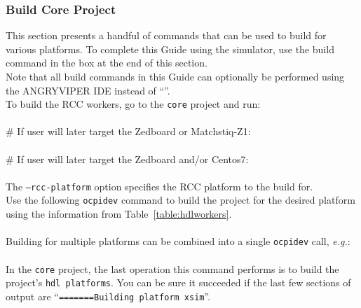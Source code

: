 \subsubsection{Build Core Project}
This section presents a handful of commands that can be used to build for various platforms. To complete this Guide using the  simulator, use the build command in the box at the end of this section. \\

Note that all build commands in this Guide can optionally be performed using the ANGRYVIPER IDE instead of ``''.\\

To build the RCC workers, go to the \texttt{core} project and run:\\ \\
\# If user will later target the Zedboard or Matchstiq-Z1:\\
\\

\# If user will later target the Zedboard and/or Centos7:\\
\\

The \texttt{--rcc-platform} option specifies the RCC platform to the build for.\\

Use the following \verb+ocpidev+ command to build the project for the desired platform using the information from Table~\ref{table:hdlworkers}.\\

 \\

Building for multiple platforms can be combined into a single \texttt{ocpidev} call, \textit{e.g.}:\\

 \\

In the \texttt{core} project, the last operation this command performs is to build the project's \texttt{hdl platforms}. You can be sure it succeeded if the last few sections of output are ``\texttt{=======Building platform xsim}''.\\
\begin{center}
\end{center}


